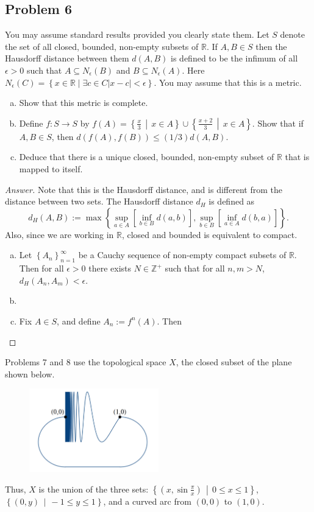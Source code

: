 \documentclass[12pt]{article}
\newcommand{\z}{\mathbb{Z}}
\newcommand{\real}{\mathbb{R}}
\newcommand\paren[1]{\left( #1 \right)}
\newcommand\setb[1]{\left \{ #1 \right \}}
\newcommand{\sqbrack}[1]{\left [ #1 \right ]}
\theoremstyle{definition}
\begin{document}
\subsection{Problem 6}
You may assume standard results provided you clearly state them. Let $S$ denote the set of all closed, bounded, non-empty subsets of $\real$. If $A , B \in S$ then the Hausdorff distance between them $d(A,B)$ is defined to be the infimum of all $\epsilon > 0$ such that $A \subseteq N_{\epsilon}(B)$ and $B \subseteq N_{\epsilon}(A)$. Here $N_{\epsilon}(C) = \setb{ x \in \real \mid \exists c \in C |x - c| < \epsilon }$. You may assume that this is a metric.
\begin{enumerate}[(a)]
    \item Show that this metric is complete.
    \item Define $f : S \to S$ by $f(A) = \setb{ \frac{x}{3} \, \middle| \, x \in A } \cup \setb{ \frac{x + 2}{3} \, \middle| \, x \in A }$. Show that if $A , B \in S$, then $d(f(A),f(B)) \leq (1/3)d(A,B)$.
    \item Deduce that there is a unique closed, bounded, non-empty subset of $\real$ that is mapped to itself.
\end{enumerate}
\begin{proof}[Answer]
    Note that this is the Hausdorff distance, and is different from the distance between two sets. The Hausdorff distance $d_H$ is defined as
    \[
        d_H(A,B) := \max \setb{ \sup\limits_{a \in A} \sqbrack{ \inf\limits_{b \in B} d(a,b) } , \sup\limits_{b \in B} \sqbrack{ \inf\limits_{a \in A} d(b,a) } }.
    \]
    Also, since we are working in $\real$, closed and bounded is equivalent to compact.
    \begin{enumerate}[(a)]
        \item Let $\setb{ A_n }_{n = 1}^{\infty}$ be a Cauchy sequence of non-empty compact subsets of $\real$. Then for all $\epsilon > 0$ there exists $N \in \z^+$ such that for all $n , m > N$, $d_H \paren{ A_n , A_m } < \epsilon$.
        \item 
        \item Fix $A \in S$, and define $A_n := f^n(A)$. Then 
    \end{enumerate}
\end{proof}
Problems 7 and 8 use the topological space $X$, the closed subset of the plane shown below.
\begin{figure}[H]
    \centering
    \includegraphics[width = 0.5\textwidth]{2.png}
    \caption{}
    \label{fig:fig2}
\end{figure}
Thus, $X$ is the union of the three sets: $\setb{ \paren{ x , \sin \frac{\pi}{x} } \, \middle| \, 0 \leq x \leq 1 }$, $\setb{ (0,y) \, \middle| \, -1 \leq y \leq 1 }$, and a curved arc from $(0,0)$ to $(1,0)$.
\end{document}
